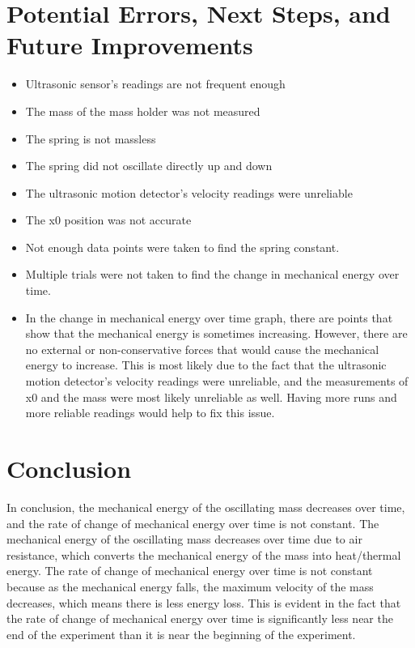 \documentclass{article}
\begin{document}
    \section{Potential Errors, Next Steps, and Future Improvements}
        \begin{itemize}
            \item Ultrasonic sensor's readings are not frequent enough
            \item The mass of the mass holder was not measured
            \item The spring is not massless
            \item The spring did not oscillate directly up and down
            \item The ultrasonic motion detector's velocity readings were unreliable
            \item The x0 position was not accurate
            \item Not enough data points were taken to find the spring constant.
            \item Multiple trials were not taken to find the change in mechanical energy over time.
            \item In the change in mechanical energy over time graph, there are points that show that the mechanical energy is sometimes increasing. However, there are no external or non-conservative forces that would cause the mechanical energy to increase. This is most likely due to the fact that the ultrasonic motion detector's velocity readings were unreliable, and the measurements of x0 and the mass were most likely unreliable as well. Having more runs and more reliable readings would help to fix this issue.
        \end{itemize}
    
    
    \section{Conclusion}
        In conclusion, the mechanical energy of the oscillating mass decreases over time, and the rate of change of mechanical energy over time is not constant.
        The mechanical energy of the oscillating mass decreases over time due to air resistance, which converts the mechanical energy of the mass into heat/thermal energy.
        The rate of change of mechanical energy over time is not constant because as the mechanical energy falls, the maximum velocity of the mass decreases, which means there is less energy loss.
        This is evident in the fact that the rate of change of mechanical energy over time is significantly less near the end of the experiment than it is near the beginning of the experiment.
        
\end{document}

